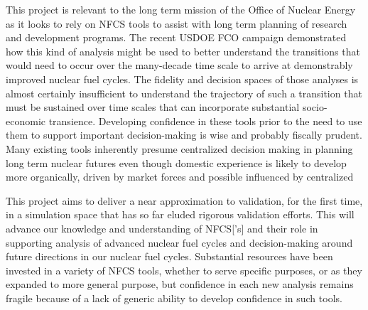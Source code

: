 This project is relevant to the long term mission of the Office of Nuclear
Energy as it looks to rely on \gls{NFCS} tools to assist with long term planning
of research and development programs.  The recent \gls{USDOE} \gls{FCO}
campaign demonstrated how this kind of analysis might be used to better
understand the transitions that would need to occur over the many-decade time
scale to arrive at demonstrably improved nuclear fuel cycles. 
The fidelity
and decision spaces of those analyses is almost certainly insufficient to
understand the trajectory of such a transition that must be sustained over
time scales that can incorporate substantial socio-economic transience.
Developing confidence in these tools prior to the need to use them to support
important decision-making is wise and probably fiscally prudent.  Many
existing tools inherently presume centralized decision making in planning long
term nuclear futures even though domestic experience is likely to develop more
organically, driven by market forces and possible influenced by centralized


This project aims to deliver a near approximation to validation, for the first
time, in a simulation space that has so far eluded rigorous validation
efforts.  This will advance our knowledge and understanding of \gls{NFCS}['s]
and their role in supporting analysis of advanced nuclear fuel cycles and
decision-making around future directions in our nuclear fuel cycles.
Substantial resources have been invested in a variety of \gls{NFCS} tools,
whether to serve specific purposes, or as they expanded to more general
purpose, but confidence in each new analysis remains fragile because of a lack
of generic ability to develop confidence in such tools.
